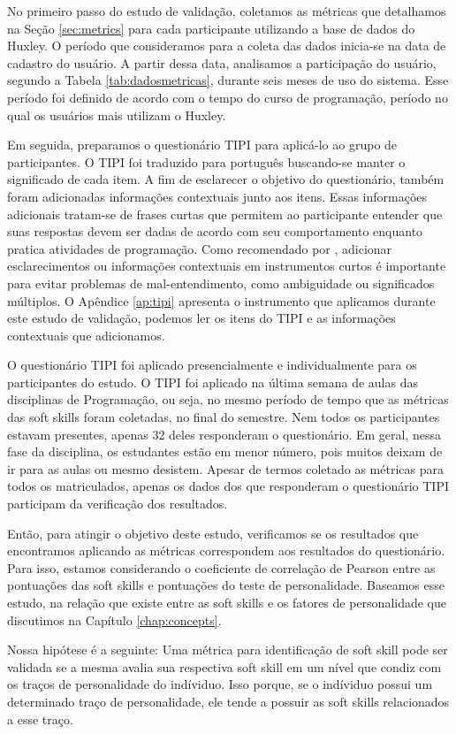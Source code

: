 No primeiro passo do estudo de validação, coletamos as métricas que detalhamos na Seção \ref{sec:metrics} para cada participante utilizando a base de dados do Huxley. O período que consideramos para a coleta das dados inicia-se na data de cadastro do usuário. A partir dessa data, analisamos a participação do usuário, segundo a Tabela \ref{tab:dadosmetricas}, durante seis meses de uso do sistema. Esse período foi definido de acordo com o tempo do curso de programação, período no qual os usuários mais utilizam o Huxley.%

Em seguida, preparamos o questionário TIPI para aplicá-lo ao grupo de participantes. O TIPI foi traduzido para português buscando-se manter o significado de cada item. A fim de esclarecer o objetivo do questionário, também foram adicionadas informações contextuais junto aos itens. Essas informações adicionais tratam-se de frases curtas que permitem ao participante entender que suas respostas devem ser dadas de acordo com seu comportamento enquanto pratica atividades de programação. Como recomendado por \cite{john:99}, adicionar esclarecimentos ou informações contextuais em instrumentos curtos é importante para evitar problemas de mal-entendimento, como ambiguidade ou significados múltiplos.
O Apêndice \ref{ap:tipi} apresenta o instrumento que aplicamos durante este estudo de validação, podemos ler os itens do TIPI e as informações contextuais que adicionamos.

O questionário TIPI foi aplicado presencialmente e individualmente para os participantes do estudo. O TIPI foi aplicado na última semana de aulas das disciplinas de Programação, ou seja, no mesmo período de tempo que as métricas das soft skills foram coletadas, no final do semestre. Nem todos os participantes estavam presentes, apenas 32 deles responderam o questionário. Em geral, nessa fase da disciplina, os estudantes estão em menor número, pois muitos deixam de ir para as aulas ou mesmo desistem. Apesar de termos coletado as métricas para todos os matriculados, apenas os dados dos que responderam o questionário TIPI participam da verificação dos resultados.

Então, para atingir o objetivo deste estudo, verificamos se os resultados que encontramos aplicando as métricas correspondem aos resultados do questionário.
Para isso, estamos considerando o coeficiente de correlação de Pearson entre as pontuações das soft skills e pontuações do teste de personalidade.
Baseamos esse estudo, na relação que existe entre as soft skills e os fatores de personalidade que discutimos na Capítulo \ref{chap:concepts}.

Nossa hipótese é a seguinte: Uma métrica para identificação de soft skill pode ser validada se a mesma avalia sua respectiva soft skill em um nível que condiz com os traços de personalidade do indíviduo. Isso porque, se o indíviduo possui um determinado traço de personalidade, ele tende a possuir as soft skills relacionados a esse traço.
